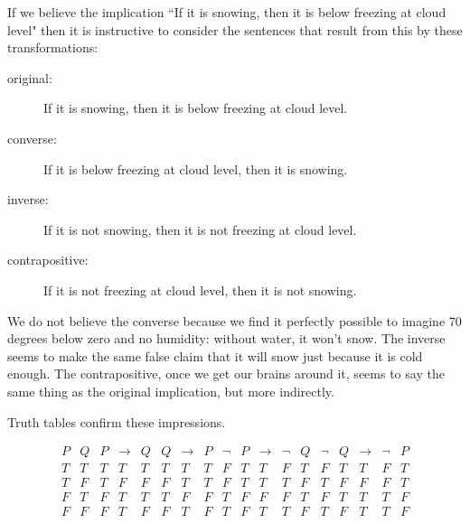 \documentclass[12pt]{article}
\begin{document}
If we believe the implication ``If it is snowing, then it is below freezing at cloud level" then it is instructive to consider the sentences that result from this by these transformations:

\begin{description}

\item[original:]  If it is snowing, then it is below freezing at cloud level.

\item[converse:]  If it is below freezing at cloud level, then it is snowing.

\item[inverse:]  If it is not snowing, then it is not freezing at cloud level.

\item[contrapositive:]  If it is not freezing at cloud level, then it is not snowing.

\end{description}

We do not believe the converse because we find it perfectly possible to imagine 70 degrees below zero and no humidity:  without water, it won't snow.
The inverse seems to make the same false claim that it will snow just because it is cold enough.  The contrapositive, once we get our brains around it, seems
to say the same thing as the original implication, but more indirectly.

Truth tables confirm these impressions.

$$\begin{array} {c|c|ccc|ccc|ccccc|ccccc}               P  &  Q  & P & \rightarrow & Q & Q & \rightarrow & P & \neg  &  P &  \rightarrow & \neg  &  Q & \neg & Q & \rightarrow & \neg & P \\  \hline

                                                                                 T   &  T & T& T & T & T & T & T & F  &  T &  T & F &  T & F & T & T & F & T \\
                                                                                T   &  F  & T & F & F & F & T & T& F &  T &  T & T &  F & T & F & F & F & T \\
                                                                                F  &  T  & F & T & T & T & F & F & T  &  F &  F & F  &  T & F& T & T & T & F \\
                                                                               F  &  F  & F & T & F & F & T & F& T  &  F &  T & T &  F & T & F & T & T & F\end{array}$$
\end{document}
